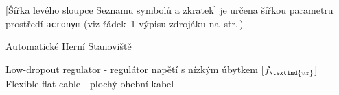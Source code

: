 \cleardoublepage
\chapter*{\listofabbrevname}
{}

\begin{acronym}[KolikMista]

		[Šířka levého sloupce Seznamu symbolů a zkratek]								%
		{je určena šířkou parametru prostředí \texttt{acronym} (viz řádek~1 výpisu zdrojáku na~str.\,\pageref{lst:zkratky})}

		{Automatické Herní Stanoviště}

		{Low-dropout regulator - regulátor napětí s nízkým úbytkem}
		[\ensuremath{f_\textind{vz}}] %
		{Flexible flat cable - plochý ohební kabel}					%

\end{acronym}
